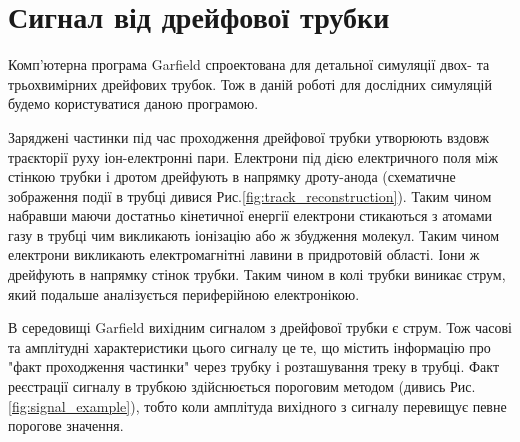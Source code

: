\documentclass[pdftex,14pt]{scrartcl}
\begin{document}

		
	
	
	\section{Сигнал від дрейфової трубки}
	
	Комп'ютерна програма Garfield \cite{garfield} спроектована для детальної симуляції двох- та трьохвимірних дрейфових трубок. Тож в даній роботі для дослідних симуляцій будемо користуватися даною програмою.
	
	Заряджені частинки під час проходження дрейфової трубки утворюють вздовж траєкторії руху іон-електронні пари. Електрони під дією електричного поля між стінкою трубки і дротом дрейфують в напрямку дроту-анода (схематичне зображення події в трубці дивися Рис.\ref{fig:track_reconstruction}). Таким чином набравши маючи достатньо кінетичної енергії електрони стикаються з атомами газу в трубці чим викликають іонізацію або ж збудження молекул. Таким чином електрони викликають електромагнітні лавини в придротовій області. Іони ж дрейфують в напрямку стінок трубки. Таким чином в колі трубки виникає струм, який подальше аналізується периферійною електронікою. 

	В середовищі Garfield вихідним сигналом з дрейфової трубки є струм. Тож часові та амплітудні характеристики цього сигналу це те, що містить інформацію про "факт проходження частинки" через трубку і розташування треку в трубці. Факт реєстрації сигналу в трубкою здійснюється пороговим методом (дивись Рис.\ref{fig:signal_example}), тобто коли амплітуда вихідного з сигналу перевищує певне порогове значення.
	
	
\end{document}
